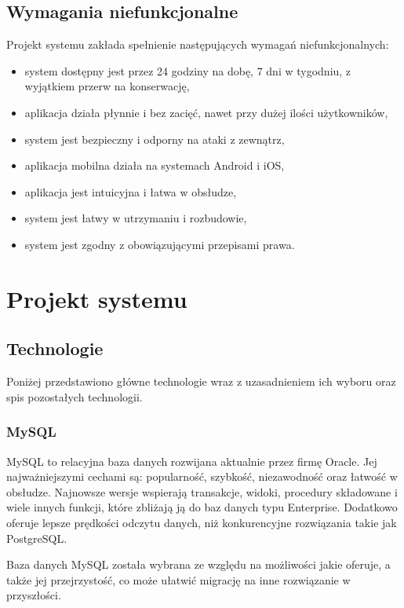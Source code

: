 \subsection{Wymagania niefunkcjonalne}

Projekt systemu zakłada spełnienie następujących wymagań niefunkcjonalnych:

\begin{itemize}
    \item system dostępny jest przez 24 godziny na dobę, 7 dni w tygodniu, z wyjątkiem przerw na konserwację,
    \item aplikacja działa płynnie i bez zacięć, nawet przy dużej ilości użytkowników,
    \item system jest bezpieczny i odporny na ataki z zewnątrz,
    \item aplikacja mobilna działa na systemach Android i iOS,
    \item aplikacja jest intuicyjna i łatwa w obsłudze,
    \item system jest łatwy w utrzymaniu i rozbudowie,
    \item system jest zgodny z obowiązującymi przepisami prawa.
\end{itemize}

\section{Projekt systemu}

\subsection{Technologie}

Poniżej przedstawiono główne technologie wraz z uzasadnieniem ich wyboru oraz spis pozostałych technologii.

\subsubsection*{MySQL}

MySQL to relacyjna baza danych rozwijana aktualnie przez firmę Oracle.
Jej najważniejszymi cechami są: popularność, szybkość, niezawodność oraz łatwość w obsłudze.
Najnowsze wersje wspierają transakcje, widoki, procedury składowane i wiele innych funkcji, które zbliżają ją do baz danych typu Enterprise.
Dodatkowo oferuje lepsze prędkości odczytu danych, niż konkurencyjne rozwiązania takie jak PostgreSQL. \cite{bib:mysql}

Baza danych MySQL została wybrana ze względu na możliwości jakie oferuje, a także jej przejrzystość, co może ułatwić migrację na inne rozwiązanie w przyszłości.

